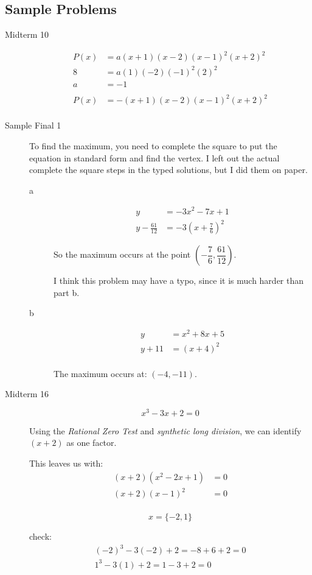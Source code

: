\documentclass[fleqn,addpoints]{exam}
\begin{document}
\subsection{Sample Problems}
\begin{description}

\item[Midterm 10]
\begin{align*}
  P(x) &= a(x+1)(x-2)(x-1)^2(x+2)^2 \\
  8 &= a(1)(-2)(-1)^2(2)^2 \\
  a &= -1 \\
  \\
  P(x) &= -(x+1)(x-2)(x-1)^2(x+2)^2 \\
\end{align*}

\item[Sample Final 1]
To find the maximum, you need to complete the square to put the equation in standard form and find the vertex.  I left
out the actual complete the square steps in the typed solutions, but I did them on paper.

\begin{description}
\item[a]
\begin{align*}
  y &= -3x^2 - 7x + 1 \\
  y - \frac{61}{12}   &= -3 \left( x+\frac{7}{6} \right)^2
\end{align*}

So the maximum occurs at the point $\left( -\dfrac{7}{6}, \dfrac{61}{12} \right)$.  

I think this problem may have a typo, since it is much harder than part b.

\item[b]
\begin{align*}
  y &= x^2 + 8x + 5 \\
  y + 11 &= (x+4)^2 \\
\end{align*}

The maximum occurs at: $(-4, -11)$.

\end{description}

\item[Midterm 16]
\[
  x^3 - 3x + 2 = 0
\]

Using the {\em Rational Zero Test} and {\em synthetic long division}, we can identify $(x+2)$ as one factor.

This leaves us with:
\begin{align*}
  (x+2)(x^2 - 2x + 1) &= 0 \\
  (x+2)(x-1)^2 &= 0 \\
\end{align*}

\[
  x = \{-2, 1\}
\]

check:
\begin{align*}
  (-2)^3 - 3(-2) + 2 = -8 + 6 + 2 = 0 \\
  1^3 - 3(1) + 2 = 1 -3 + 2 = 0 \\
\end{align*}

\end{description}
\end{document}
